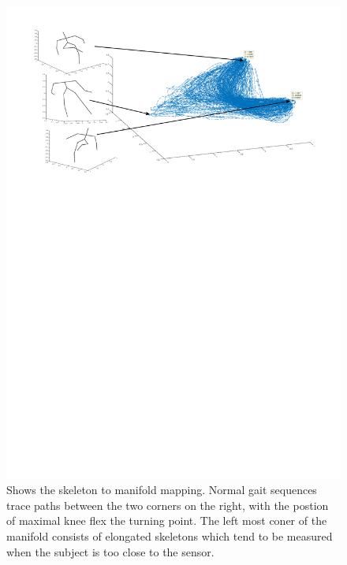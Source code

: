 \documentclass[11pt]{article} %
\begin{document}
\begin{figure}
\centering
\includegraphics*[trim={1cm 18cm 1cm 1cm},clip,width=0.96\linewidth,clip]{skelToManifod} 
\caption{Shows the skeleton to manifold mapping. Normal gait sequences trace paths between the two corners on the right, with the postion of maximal knee flex the turning point. The left most coner of the manifold consists of elongated skeletons which tend to be measured when the subject is too close to the sensor. }
\label{fig:skelToManifod}
\end{figure}
\end{document}
